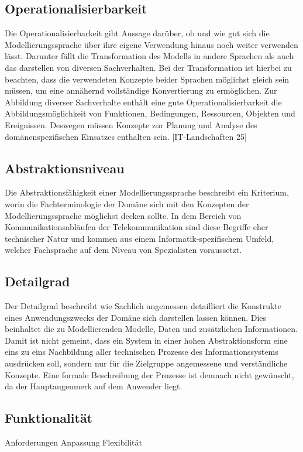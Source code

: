 \subsection{Operationalisierbarkeit}
\label{ssc:Operationalisierbarkeit}
Die Operationalisierbarkeit gibt Aussage darüber, ob und wie gut sich die Modellierungssprache über ihre eigene Verwendung hinaus noch weiter verwenden lässt.
Darunter fällt die Transformation des Modells in andere Sprachen als auch das darstellen von diversen Sachverhalten.
Bei der Transformation ist hierbei zu beachten, dass die verwendeten Konzepte beider Sprachen möglichst gleich sein müssen,
um eine annähernd vollständige Konvertierung zu ermöglichen. Zur Abbildung diverser Sachverhalte enthält eine gute Operationalisierbarkeit die Abbildungsmöglichkeit von Funktionen, Bedingungen, Ressourcen, Objekten und Ereignissen.
Deswegen müssen Konzepte zur Planung und Analyse des domänenspezifischen Einsatzes enthalten sein.
[IT-Landschaften 25]

\subsection{Abstraktionsniveau}
\label{ssc:Abstraktionsniveau}
Die Abstraktionsfähigkeit einer Modellierungssprache beschreibt ein Kriterium, worin die Fachterminologie der Domäne sich mit den Konzepten der Modellierungssprache möglichst decken sollte. In dem Bereich von Kommunikationsabläufen der Telekommunikation sind diese Begriffe eher technischer Natur und kommen aus einem Informatik-spezifischem Umfeld, welcher Fachsprache auf dem Niveau von Spezialisten voraussetzt. 

\subsection{Detailgrad}
\label{ssc:Detailgrad}
Der Detailgrad beschreibt wie Sachlich angemessen detailliert die Konstrukte eines Anwendungszwecks der Domäne sich darstellen lassen können. Dies beinhaltet die zu Modellierenden Modelle, Daten und zusätzlichen Informationen. Damit ist nicht gemeint, dass ein System in einer hohen Abstraktionsform eine eins zu eins Nachbildung 
aller technischen Prozesse des Informationssystems ausdrücken soll, sondern nur für die Zielgruppe angemessene und verständliche Konzepte. Eine formale Beschreibung der Prozesse ist demnach nicht gewünscht, da der Hauptaugenmerk auf dem Anwender liegt.

\subsection{Funktionalität}
\label{ssc:Funktionalität}
Anforderungen
Anpassung
Flexibilität

